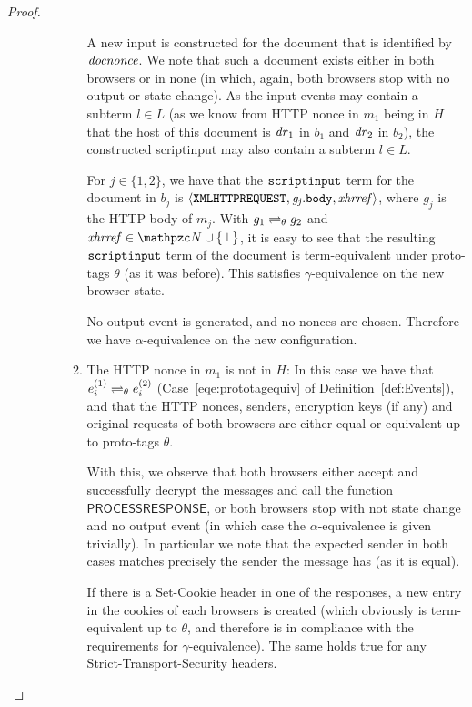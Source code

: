 \begin{proof}
\begin{description}
\begin{enumerate}[I.]
\begin{enumerate}
              A new input is constructed for the document that is identified
              by $\mathit{docnonce}$. We note that such a document exists either
              in both browsers or in none (in which, again, both browsers
              stop with no output or state change). As the input events may
              contain a subterm $l \in L$ (as we know from HTTP nonce in
              $m_1$ being in $H$ that the host of this document is
              $\mathit{dr}_1$ in $b_1$ and $\mathit{dr}_2$ in $b_2$), the
              constructed scriptinput may also contain a subterm $l \in L$.
      
              For $j \in \{1,2\}$, we have that the $\mathtt{scriptinput}$ term
              for the document in $b_j$ is $\langle\mathtt{XMLHTTPREQUEST},
                \mathit{g_j}.\mathtt{body}, \mathit{xhrref}\rangle$, where $g_j$ is the HTTP
              body of $m_j$.  With $g_1 \rightleftharpoons_{\theta} g_2$ and
              $\mi{xhrref} \in \nonces \cup \{\bot\}$, it is easy to see
              that the resulting $\mathtt{scriptinput}$ term of the document is
              term-equivalent under proto-tags $\theta$ (as it was before).
              This satisfies $\gamma$-equivalence on the new browser state.
      
              No output event is generated, and no nonces are chosen.
              Therefore we have $\alpha$-equivalence on the new
              configuration.
      
            \item The HTTP nonce in $m_1$ is not in $H$: In this case we
              have that $e_i^{(1)} \rightleftharpoons_{\theta} e_i^{(2)}$
              (Case~\ref{eqe:prototagequiv} of
              Definition~\ref{def:Events}), and that the HTTP nonces,
              senders, encryption keys (if any) and original requests of both browsers are either equal or
              equivalent up to proto-tags $\theta$.

              With this, we observe that both browsers either accept and
              successfully decrypt the messages and call the function
              $\mathsf{PROCESSRESPONSE}$, or both browsers stop with not
              state change and no output event (in which case the
              $\alpha$-equivalence is given trivially). In particular we
              note that the expected sender in both cases matches precisely
              the sender the message has (as it is equal).
      
              If there is a Set-Cookie header in one of the responses, a new
              entry in the cookies of each browsers is created (which
              obviously is term-equivalent up to $\theta$, and therefore is
              in compliance with the requirements for $\gamma$-equivalence).
              The same holds true for any Strict-Transport-Security headers.
      

\end{enumerate}
\end{enumerate}
\end{description}
\end{proof}
